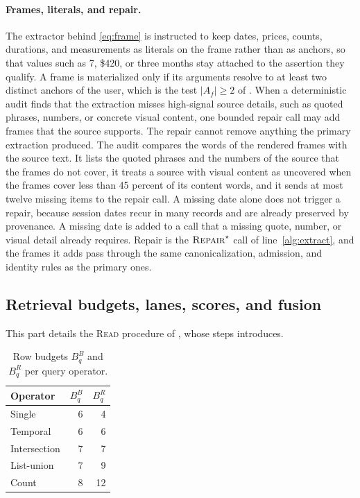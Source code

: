 \paragraph{Frames, literals, and repair.}
The extractor behind \eqref{eq:frame} is instructed to keep dates, prices,
counts, durations, and measurements as literals on the frame rather than as
anchors, so that values such as 7, \$420, or three months stay attached to the
assertion they qualify. A frame is materialized only if its arguments resolve
to at least two distinct anchors of the user, which is the test \(|A_f|\ge 2\)
of . When a deterministic audit finds that the extraction
misses high-signal source details, such as quoted phrases, numbers, or concrete
visual content, one bounded repair call may add frames that the source
supports. The repair cannot remove anything the primary extraction produced.
The audit compares the words of the rendered frames with the source text. It
lists the quoted phrases and the numbers of the source that the frames do not
cover, it treats a source with visual content as uncovered when the frames
cover less than 45 percent of its content words, and it sends at most twelve
missing items to the repair call. A missing date alone does not trigger a
repair, because session dates recur in many records and are already preserved
by provenance. A missing date is added to a call that a missing quote, number,
or visual detail already requires. Repair is the \(\textsc{Repair}^\star\) call of
line~\ref{alg:extract}, and the frames it adds pass through the same
canonicalization, admission, and identity rules as the primary ones.

\subsection{Retrieval budgets, lanes, scores, and fusion}
\label{app:method-retrieval}

This part details the \textsc{Read} procedure of , whose steps
 introduces.

\begin{table}
\vspace{-0.6\baselineskip}
\centering
\captionsetup{justification=centering}
\caption{Row budgets \(B_q^B\) and \(B_q^R\) per query operator.}
\label{tab:lane-budgets}
\begin{tabular}{lrr}
\toprule
Operator & \(B_q^B\) & \(B_q^R\) \\
\midrule
Single & 6 & 4 \\
Temporal & 6 & 6 \\
Intersection & 7 & 7 \\
List-union & 7 & 9 \\
Count & 8 & 12 \\
\bottomrule
\end{tabular}
\vspace{-0.4\baselineskip}
\end{table}
